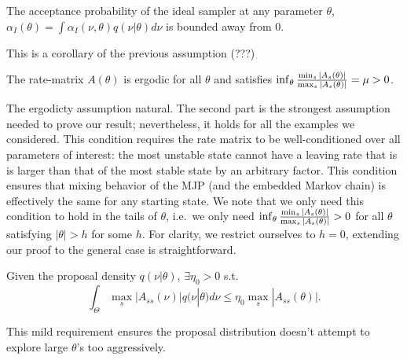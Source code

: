 \begin{assumption}
 The acceptance probability of the ideal sampler at any parameter
 $\theta$, $\alpha_I(\theta) = \int \alpha_I(\nu,\theta)q(\nu|\theta)d\nu$
 is bounded away from $0$.
  \label{asmp:ideal_rej_bnd}
\end{assumption}
\noindent This is a corollary of the previous assumption (???)
\begin{assumption}
  The rate-matrix $A(\theta)$ is ergodic for all $\theta$ and satisfies 
  $\inf_\theta \frac{{\min_s |A_s(\theta)|}}{{\max_s |A_s(\theta)|}} = \mu > 0$.
  \label{asmp:cond_num}
\end{assumption}
\noindent The ergodicty assumption natural. The second part is the
strongest assumption needed to prove our
result; nevertheless, it holds for all the examples we considered. This 
condition requires the rate matrix to
be well-conditioned over all parameters of interest: the most unstable
state cannot have a leaving rate that is is larger than that of
the most stable state by an arbitrary factor. This condition ensures that
mixing behavior of the MJP (and the embedded Markov chain) is effectively
the same for any starting state. We note that we only need this
condition to hold in the tails of $\theta$, i.e.\ we only need
  $\inf_\theta \frac{{\min_s |A_s(\theta)|}}{{\max_s |A_s(\theta)|}} > 0$ for all $\theta$
  satisfying $|\theta| > h$ for some $h$. For clarity, we restrict
  ourselves to $h=0$, extending our proof to the general case is
  straightforward.

\begin{assumption}
Given the proposal density $q(\nu | \theta)$, $\exists \eta_0 > 0$ s.t. $$ \int_\Theta \max_s|A_{ss}(\nu)| q(\nu | \theta)d\nu \leq \eta_0 \max_s|A_{ss}(\theta)|.$$
\end{assumption}
\noindent This mild requirement ensures the proposal distribution doesn't attempt
to explore large $\theta$'s too aggressively.


